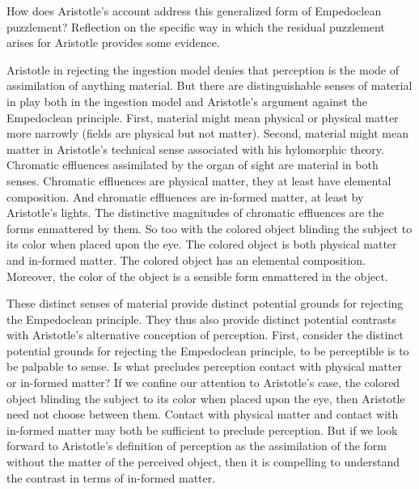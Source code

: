 How does Aristotle's account address this generalized form of Empedoclean puzzlement? Reflection on the specific way in which the residual puzzlement arises for Aristotle provides some evidence.

Aristotle in rejecting the ingestion model denies that perception is the mode of assimilation of anything material. But there are distinguishable senses of material in play both in the ingestion model and Aristotle's argument against the Empedoclean principle. First, material might mean physical or physical matter more narrowly (fields are physical but not matter). Second, material might mean matter in Aristotle's technical sense associated with his hylomorphic theory. Chromatic effluences assimilated by the organ of sight are material in both senses. Chromatic effluences are physical matter, they at least have elemental composition. And chromatic effluences are in-formed matter, at least by Aristotle's lights. The distinctive magnitudes of chromatic effluences are the forms enmattered by them. So too with the colored object blinding the subject to its color when placed upon the eye. The colored object is both physical matter and in-formed matter. The colored object has an elemental composition. Moreover, the color of the object is a sensible form enmattered in the object.

These distinct senses of material provide distinct potential grounds for rejecting the Empedoclean principle. They thus also provide distinct potential contrasts with Aristotle's alternative conception of perception. First, consider the distinct potential grounds for rejecting the Empedoclean principle, to be perceptible is to be palpable to sense. Is what precludes perception contact with physical matter or in-formed matter? If we confine our attention to Aristotle's case, the colored object blinding the subject to its color when placed upon the eye, then Aristotle need not choose between them. Contact with physical matter and contact with in-formed matter may both be sufficient to preclude perception. But if we look forward to Aristotle's definition of perception as the assimilation of the form without the matter of the perceived object, then it is compelling to understand the contrast in terms of in-formed matter. 


